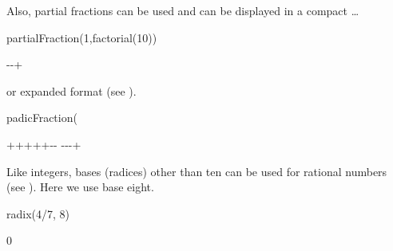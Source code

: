 {{{{{{{{\begin{xtc}
\begin{TeXOutput}
\end{TeXOutput}
\end{xtc}
\begin{xtc}
\begin{xtccomment}
Also, partial fractions can be used and can be displayed in a
compact \ldots
{}
\end{xtccomment}
\begin{spadsrc}
partialFraction(1,factorial(10)) 
\end{spadsrc}
\begin{TeXOutput}
\begin{fricasmath}{20}
-{}-{}+%
%
\end{fricasmath}
\end{TeXOutput}
\end{xtc}
\begin{xtc}
\begin{xtccomment}
or expanded format (see ).
\end{xtccomment}
\begin{spadsrc}
padicFraction(%
\end{spadsrc}
\begin{TeXOutput}
\begin{fricasmath}{21}
+++++-{}-{%
}-{}-{}-{}+%
\end{fricasmath}
\end{TeXOutput}
\end{xtc}
\begin{xtc}
\begin{xtccomment}
Like integers, bases (radices) other than ten can be used for rational
numbers (see ).
Here we use base eight.
\end{xtccomment}
\begin{spadsrc}
radix(4/7, 8)
\end{spadsrc}
\begin{TeXOutput}
\begin{fricasmath}{22}
0%
\end{fricasmath}
\end{TeXOutput}

\end{xtc}}}}}}}}}
